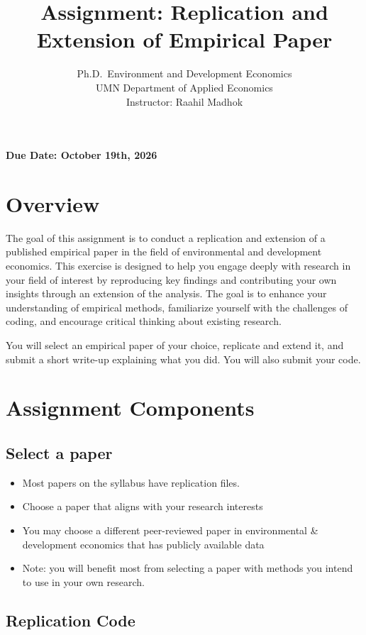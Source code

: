 \documentclass[
]{article}
\title{Assignment: Replication and Extension of Empirical Paper}
\subtitle{Ph.D.~Environment and Development Economics\\
UMN Department of Applied Economics\\
Instructor: Raahil Madhok}
\author{}
\date{\vspace{-2.5em}}
\providecommand{\tightlist}{%
  \setlength{\itemsep}{0pt}\setlength{\parskip}{0pt}}
\begin{document}
\maketitle

\textbf{Due Date: October 19th, 2026}

\hypertarget{overview}{%
\section{Overview}\label{overview}}

The goal of this assignment is to conduct a replication and extension of a published empirical paper in the field of environmental and development economics. This exercise is designed to help you engage deeply with research in your field of interest by reproducing key findings and contributing your own insights through an extension of the analysis. The goal is to enhance your understanding of empirical methods, familiarize yourself with the challenges of coding, and encourage critical thinking about existing research.

You will select an empirical paper of your choice, replicate and extend it, and submit a short write-up explaining what you did. You will also submit your code.

\hypertarget{assignment-components}{%
\section{Assignment Components}\label{assignment-components}}

\hypertarget{select-a-paper}{%
\subsection{Select a paper}\label{select-a-paper}}

\begin{itemize}
\tightlist
\item
  Most papers on the syllabus have replication files.
\item
  Choose a paper that aligns with your research interests
\item
  You may choose a different peer-reviewed paper in environmental \& development economics that has publicly available data
\item
  Note: you will benefit most from selecting a paper with methods you intend to use in your own research.
\end{itemize}

\hypertarget{replication-code}{%
\subsection{Replication Code}\label{replication-code}}
\end{document}
